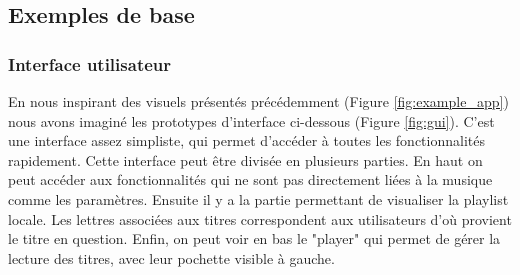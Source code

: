 \documentclass{article}
\begin{document}
		
		

		\subsection{Exemples de base}

        \subsubsection{Interface utilisateur}\label{interface_utilisateur}
            	En nous inspirant des visuels présentés précédemment (Figure \ref{fig:example_app}) nous avons imaginé les prototypes d'interface ci-dessous (Figure \ref{fig:gui}). C'est une interface assez simpliste, qui permet d'accéder à toutes les fonctionnalités rapidement. Cette interface peut être divisée en plusieurs parties. En haut on peut accéder aux fonctionnalités qui ne sont pas directement liées à la musique comme les paramètres. Ensuite il y a la partie permettant de visualiser la playlist locale. Les lettres associées aux titres correspondent aux utilisateurs d'où provient le titre en question.
            	Enfin, on peut voir en bas le "player" qui permet de gérer la lecture des titres, avec leur pochette visible à gauche.
\end{document}
